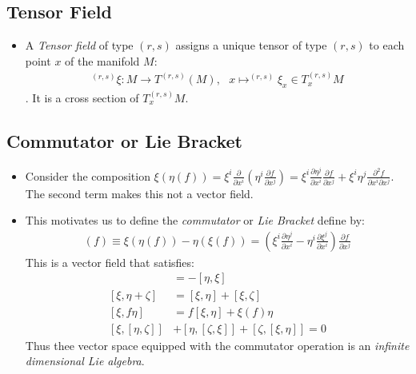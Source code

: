 \documentclass[11pt]{article}
\numberwithin{equation}{section}
\newcommand{\I}[1]{\emph{#1}}
\begin{document}
\subsection{Tensor Field} %
\label{sub:tensor_field}
\begin{itemize}
  \item A \I{Tensor field} of type $(r,s)$ assigns a unique tensor of type $(r,s)$ to each point $x$ of the manifold $M$:
  \begin{align*}
    ^{(r,s)}\xi:M \rightarrow T^{(r,s)}(M),~~~x \mapsto ^{(r,s)}\xi_x \in T^{(r,s)}_xM
  \end{align*}
.   It is a cross section of $T^{(r,s)}_xM$. 
\end{itemize}

\subsection{Commutator or Lie Bracket} %
\label{sub:commutator_or_lie_bracket}
\begin{itemize}
  \item Consider the composition $\xi(\eta(f)) = \xi^{i}\frac{\partial}{\partial x^i}\left(\eta^{i}\frac{\partial f}{\partial x^j}\right) = \xi^i\frac{\partial \eta^j}{\partial x^i}\frac{\partial f}{\partial x^j}+\xi^i\eta^j\frac{\partial^2 f}{\partial x^i\partial x^j}$. The second term makes this not a vector field.  

  \item This motivates us to define the \I{commutator} or \I{Lie Bracket} define by:
  \begin{align*}
  [\xi,\eta](f) \equiv \xi(\eta(f))  - \eta(\xi(f)) = \left(\xi^i\frac{\partial \eta^j}{\partial x^i}-\eta^i\frac{\partial \xi^j}{\partial x^i}\right)\frac{\partial f}{\partial x^j}
  \end{align*}
  This is a vector field that satisfies:
\begin{align*}
[\xi, \eta] &= -[\eta, \xi] \\
[\xi, \eta + \zeta] &= [\xi, \eta] + [\xi, \zeta] \\
[\xi, f\eta] &= f[\xi, \eta] + \xi(f)\eta \\
[\xi, [\eta, \zeta]] &+ [\eta, [\zeta, \xi]] + [\zeta, [\xi, \eta]] = 0
\end{align*}
Thus thee vector space equipped with the commutator operation is an \I{infinite dimensional Lie algebra}.
\end{itemize}
\end{document}
